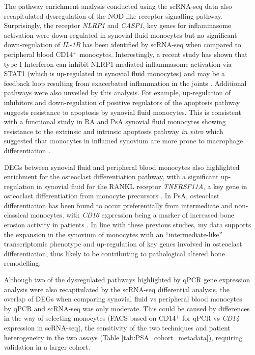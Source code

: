 The pathway enrichment analysis conducted using the scRNA-seq data also recapitulated dysregulation of the NOD-like receptor signalling pathway. Surprisingly, the receptor \textit{NLRP1} and \textit{CASP1}, key genes for inflammasome activation were down-regulated in synovial fluid monocytes but no significant down-regulation of \textit{IL-1B}  has been identified by scRNA-seq when compared to peripheral blood CD14$^+$ monocytes.  Interestingly, a recent study has shown that type I Interferon can inhibit NLRP1-mediated inflammasome activation via STAT1 (which is up-regulated in synovial fluid monocytes) and may be a feedback loop resulting from exacerbated inflammation in the joints \parencite{Guarda2011}. Additional pathways were also unveiled by this analysis. For example, up-regulation of inhibitors and down-regulation of positive regulators of the apoptosis pathway suggests resistance to apoptosis by synovial fluid monocytes. This is consistent with a functional study in RA and PsA synovial fluid monocytes showing resistance to the extrinsic and intrinsic apoptosis pathway \textit{in vitro} which suggested that monocytes in inflamed synovium are more prone to macrophage differentiation \parencite{Rajasekhar2017,Srivastava2010}. 

DEGs between synovial fluid and peripheral blood monocytes also highlighted enrichment for the osteoclast differentiation pathway, with a significant up-regulation in synovial fluid for the  RANKL receptor \textit{TNFRSF11A}, a key gene in osteoclast differentiation from monocyte precursors \parencite{Mensah2008}. In PsA, osteoclast differentiation has been found to occur preferentially from intermediate and non-classical monocytes, with \textit{CD16} expression being a marker of increased bone erosion activity in patients \parencite{Chiu2010}. In line with these previous studies, my data supports the expansion in the synovium of monocytes with an ``intermediate-like'' transcriptomic phenotype and up-regulation of key genes involved in osteoclast differentiation, thus likely to be contributing to pathological altered bone remodelling.

Although two of the dysregulated pathways highlighted by qPCR gene expression analysis were also recapitulated by the scRNA-seq differential analysis, the overlap of DEGs when comparing synovial fluid vs peripheral blood monocytes by qPCR and scRNA-seq was only moderate. %
 This could be caused by differences in the way of selecting monocytes (FACS based on CD14$^+$ for qPCR vs \textit{CD14} expression in scRNA-seq), the sensitivity of the two techniques and patient heterogeneity in the two assays (Table \ref{tab:PSA_cohort_metadata}), requiring validation in a larger cohort.



